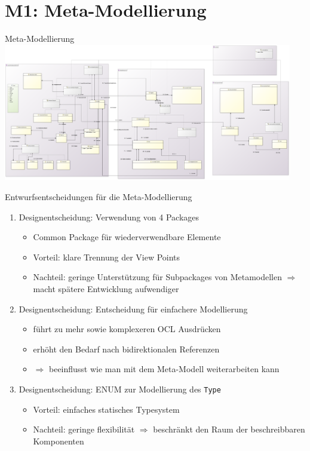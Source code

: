 \section[M1: Metamodell]{M1: Meta-Modellierung}
\begin{frame}{Meta-Modellierung}
	\centering
	\includegraphics[height=60mm]{figures/meta-modell.png}
\end{frame}

\begin{frame}{Entwurfsentscheidungen für die Meta-Modellierung}
	\begin{enumerate}
		\item Designentscheidung: Verwendung von 4 Packages
		\begin{itemize}
			\item Common Package für wiederverwendbare Elemente
			\item Vorteil: klare Trennung der View Points
			\item Nachteil: geringe Unterstützung für Subpackages von Metamodellen $\Rightarrow$ macht spätere Entwicklung aufwendiger
		\end{itemize}
		\item Designentscheidung: Entscheidung für einfachere Modellierung
		\begin{itemize}
			\item führt zu mehr sowie komplexeren OCL Ausdrücken
			\item erhöht den Bedarf nach bidirektionalen Referenzen
			\item $\Rightarrow$ beeinflusst wie man mit dem Meta-Modell weiterarbeiten kann
		\end{itemize}
		\item Designentscheidung: ENUM zur Modellierung des \texttt{Type}
		\begin{itemize}
			\item Vorteil: einfaches statisches Typesystem
			\item Nachteil: geringe flexibilität $\Rightarrow$ beschränkt den Raum der beschreibbaren Komponenten
		\end{itemize}
	\end{enumerate}
\end{frame}


